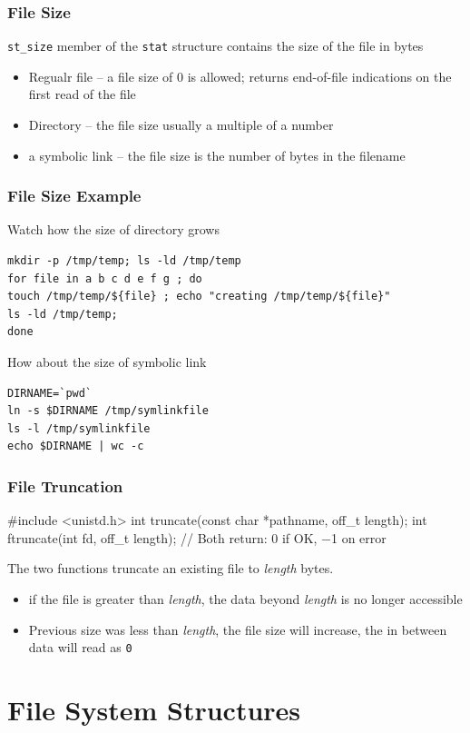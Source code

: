\documentclass[newPxFont,sthlmFooter,nooffset]{beamer}
\begin{document}
\begin{frame}[t]
  \frametitle{File Size}
\texttt{st\_size} member of the \texttt{stat} structure contains the size of the file in bytes
\begin{itemize}
\item Regualr file -- a file size of 0 is allowed; returns end-of-file indications on the first read of the file
\item Directory -- the file size usually a multiple of a number
\item a symbolic link -- the file size is the number of bytes in the filename
\end{itemize}
\end{frame}


\begin{frame}[fragile,t]
  \frametitle{File Size Example}

Watch how the size of directory grows

\begin{verbatim}
mkdir -p /tmp/temp; ls -ld /tmp/temp
for file in a b c d e f g ; do
touch /tmp/temp/${file} ; echo "creating /tmp/temp/${file}"
ls -ld /tmp/temp;
done
\end{verbatim}

How about the size of symbolic link
\begin{verbatim}
DIRNAME=`pwd`
ln -s $DIRNAME /tmp/symlinkfile
ls -l /tmp/symlinkfile
echo $DIRNAME | wc -c
\end{verbatim}
\end{frame}

\begin{frame}[containsverbatim,t]
  \frametitle{File Truncation}
\begin{codedef}
#include <unistd.h>
int truncate(const char *pathname, off_t length);
int ftruncate(int fd, off_t length);
// Both return: 0 if OK, −1 on error
\end{codedef}
The two functions truncate an existing file to \textit{length} bytes.
\begin{itemize}
\item if the file is greater than \textit{length}, the data beyond \textit{length} is no longer accessible
\item Previous size was less than \textit{length}, the file size will increase, the in between data will read as \texttt{0}
\end{itemize}

\end{frame}


\section{File System Structures}
\end{document}
